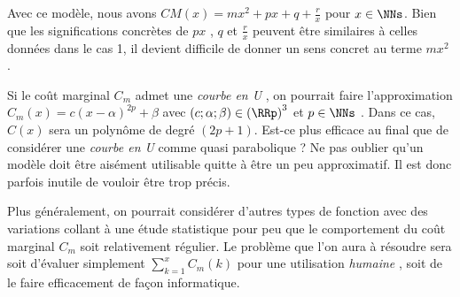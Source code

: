 \bigskip

Avec ce modèle, nous avons $CM(x) = m x^2 + p x + q + \frac{r}{x}$ pour $x \in \NNs$.
Bien que les significations concrètes de $p x$ , $q$  et $\frac{r}{x}$ peuvent être similaires à celles données dans le cas 1, il devient difficile de donner un sens concret au terme $m x^2$ .  




\begin{remark}
	Si le coût marginal $C_m$ admet une \emph{\og courbe en U \fg}, on pourrait faire l'approximation $C_m(x) = c (x - \alpha)^{2p} + \beta$ avec $(c ; \alpha ; \beta) \in \left( \RRp \right)^3$ et $p \in \NNs$ .
	Dans ce cas, $C(x)$ sera un polynôme de degré $(2p + 1)$. Est-ce plus efficace au final que de considérer une \emph{\og courbe en U \fg} comme quasi parabolique ?
	Ne pas oublier qu'un modèle doit être aisément utilisable quitte à être un peu approximatif. Il est donc parfois inutile de vouloir être trop précis.
\end{remark}




\begin{remark}
	Plus généralement, on pourrait considérer d'autres types de fonction avec des variations collant à une étude statistique pour peu que le comportement du coût marginal $C_m$ soit relativement régulier. Le problème que l'on aura à résoudre sera soit d'évaluer simplement $\displaystyle \sum_{k = 1}^{x} C_m(k)$ pour une utilisation \emph{\og humaine \fg}, soit de le faire efficacement de façon informatique.
\end{remark}
